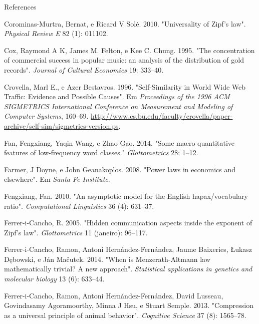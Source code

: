 \documentclass[
  ignorenonframetext,
  aspectratio=169]{beamer}
\newlength{\cslhangindent}
\newlength{\cslentryspacingunit} %
\newenvironment{CSLReferences}[2] %
 {%
  \setlength{\parindent}{0pt}
  \ifodd #1
  \let\oldpar\par
  \def\par{\hangindent=\cslhangindent\oldpar}
  \fi
  \setlength{\parskip}{#2\cslentryspacingunit}
 }%
 {}
\begin{document}
\begin{frame}[allowframebreaks]{References}
\begin{CSLReferences}{1}{0}
\leavevmode{}%
Corominas-Murtra, Bernat, e Ricard V Solé. 2010. {"Universality of
Zipf's law"}. \emph{Physical Review E} 82 (1): 011102.

\leavevmode{}%
Cox, Raymond A K, James M. Felton, e Kee C. Chung. 1995. {"The
concentration of commercial success in popular music: an analysis of the
distribution of gold records"}. \emph{Journal of Cultural Economics} 19:
333--40.

\leavevmode{}%
Crovella, Marl E., e Azer Bestavros. 1996. {"Self-Similarity in {W}orld
{W}ide {W}eb Traffic: Evidence and Possible Causes"}. Em
\emph{Proceedings of the 1996 ACM SIGMETRICS International Conference on
Measurement and Modeling of Computer Systems}, 160--69.
\url{http://www.cs.bu.edu/faculty/crovella/paper-archive/self-sim/sigmetrics-version.ps}.

\leavevmode{}%
Fan, Fengxiang, Yaqin Wang, e Zhao Gao. 2014. {"Some macro quantitative
features of low-frequency word classes."} \emph{Glottometrics} 28:
1--12.

\leavevmode{}%
Farmer, J Doyne, e John Geanakoplos. 2008. {"Power laws in economics and
elsewhere"}. Em \emph{Santa Fe Institute}.

\leavevmode{}%
Fengxiang, Fan. 2010. {"An asymptotic model for the English
hapax/vocabulary ratio"}. \emph{Computational Linguistics} 36 (4):
631--37.

\leavevmode{}%
Ferrer-i-Cancho, R. 2005. {"Hidden communication aspects inside the
exponent of Zipf's law"}. \emph{Glottometrics} 11 (janeiro): 96--117.

\leavevmode{}%
Ferrer-i-Cancho, Ramon, Antoni Hernández-Fernández, Jaume Baixeries,
Łukasz Dębowski, e Ján Mačutek. 2014. {"When is Menzerath-Altmann law
mathematically trivial? A new approach"}. \emph{Statistical applications
in genetics and molecular biology} 13 (6): 633--44.

\leavevmode{}%
Ferrer-i-Cancho, Ramon, Antoni Hernández-Fernández, David Lusseau,
Govindasamy Agoramoorthy, Minna J Hsu, e Stuart Semple. 2013.
{"Compression as a universal principle of animal behavior"}.
\emph{Cognitive Science} 37 (8): 1565--78.


\end{CSLReferences}
\end{frame}
\end{document}
